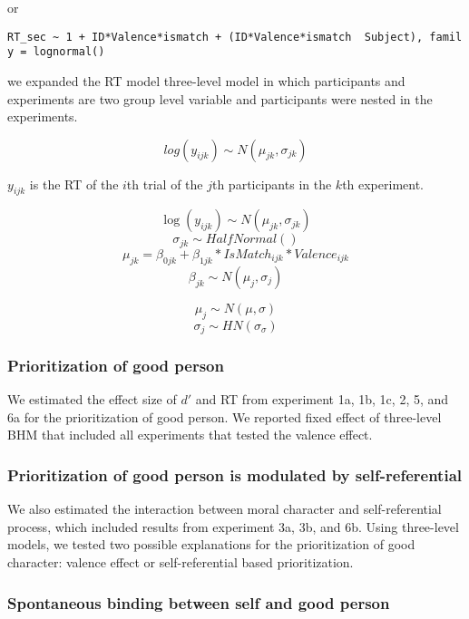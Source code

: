 \documentclass[
  man]{apa6}
\begin{document}
or

\texttt{RT\_sec\ \textasciitilde{}\ 1\ +\ ID*Valence*ismatch\ +\ (ID*Valence*ismatch\ \textbar{}\ Subject),\ family\ =\ lognormal()}

we expanded the RT model three-level model in which participants and experiments are two group level variable and participants were nested in the experiments.

\[ log(y_{ijk}) \sim N(\mu_{jk}, \sigma_{jk})\]

\(y_{ijk}\) is the RT of the \(i\)th trial of the \(j\)th participants in the \(k\)th experiment.

\[\log(y_{ijk}) \sim N(\mu_{jk}, \sigma_{jk})\]
\[\sigma_{jk} \sim HalfNormal()\]
\[\mu_{jk} = \beta_{0jk} + \beta_{1jk}*IsMatch_{ijk} * Valence_{ijk} \]
\[\beta_{jk} \sim N(\mu_{j}, \sigma_j)\]

\[\mu_j \sim N(\mu, \sigma)\]
\[\sigma_j \sim HN(\sigma_{\sigma})\]

\hypertarget{prioritization-of-good-person}{%
\subsubsection{Prioritization of good person}\label{prioritization-of-good-person}}

We estimated the effect size of \(d'\) and RT from experiment 1a, 1b, 1c, 2, 5, and 6a for the prioritization of good person. We reported fixed effect of three-level BHM that included all experiments that tested the valence effect.

\hypertarget{prioritization-of-good-person-is-modulated-by-self-referential}{%
\subsubsection{Prioritization of good person is modulated by self-referential}\label{prioritization-of-good-person-is-modulated-by-self-referential}}

We also estimated the interaction between moral character and self-referential process, which included results from experiment 3a, 3b, and 6b. Using three-level models, we tested two possible explanations for the prioritization of good character: valence effect or self-referential based prioritization.

\hypertarget{spontaneous-binding-between-self-and-good-person}{%
\subsubsection{Spontaneous binding between self and good person}\label{spontaneous-binding-between-self-and-good-person}}
\end{document}
